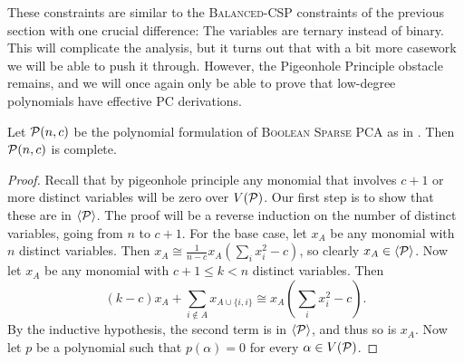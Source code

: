 These constraints are similar to the \textsc{Balanced-CSP} constraints of the previous section with one crucial difference: The variables are ternary instead of binary.
This will complicate the analysis, but it turns out that with a bit more casework we will be able to push it through.
However, the Pigeonhole Principle obstacle remains, and we will once again only be able to prove that low-degree polynomials have effective PC derivations.
\begin{lemma}\label{lem:bspca-complete}
Let $\mathcal P(n,c)$ be the polynomial formulation of \textsc{Boolean Sparse PCA} as in . Then $\mathcal P(n,c)$ is complete.
\end{lemma}
\begin{proof}
Recall that by pigeonhole principle any monomial that involves $c+1$ or more distinct variables will be zero over $V(\mathcal P)$. Our first step is to show that these are in $\langle \mathcal P \rangle$. The proof will be a reverse induction on the number of distinct variables, going from $n$ to $c+1$.  
For the base case, let $x_A$ be any monomial with $n$ distinct variables. Then $x_A \cong \frac{1}{n-c} x_A(\sum_i x_i^2 - c)$, so clearly $x_A \in \langle \mathcal P \rangle$.
Now let $x_A$ be any monomial with $c+1 \leq k < n$ distinct variables. Then
\[\left(k-c\right)x_A + \sum_{i \notin A} x_{A \cup \{i,i\}} \cong x_A(\sum_i x^2_i - c).\]
By the inductive hypothesis, the second term is in $\langle \mathcal P \rangle$, and thus so is $x_A$. 
Now let $p$ be a polynomial such that $p(\alpha) = 0$ for every $\alpha \in V(\mathcal P)$. 

\end{proof}
